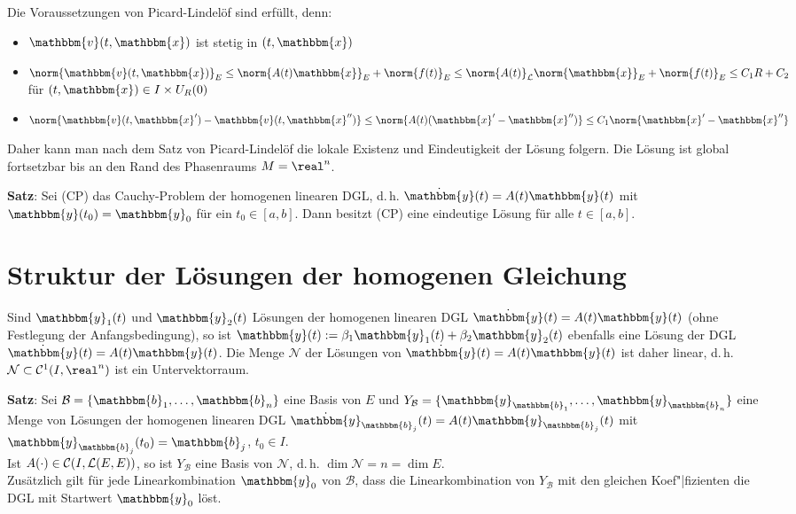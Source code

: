 Die Voraussetzungen von Picard-Lindelöf sind erfüllt, denn:
\begin{itemize}
    \item
    $\mathbbm{v}(t, \mathbbm{x})$ ist stetig in $(t, \mathbbm{x})$

    \item
    $\norm{\mathbbm{v}(t, \mathbbm{x})}_E \le
    \norm{A(t) \mathbbm{x}}_E + \norm{f(t)}_E \le
    \norm{A(t)}_\L \norm{\mathbbm{x}}_E + \norm{f(t)}_E \le
    C_1 R + C_2$ \\
    für $(t, \mathbbm{x}) \in I \times U_R(0)$

    \item
    $\norm{\mathbbm{v}(t, \mathbbm{x}') - \mathbbm{v}(t, \mathbbm{x}'')} \le
    \norm{A(t) (\mathbbm{x}' - \mathbbm{x}'')} \le
    C_1 \norm{\mathbbm{x}' - \mathbbm{x}''}$
\end{itemize}
Daher kann man nach dem Satz von Picard-Lindelöf die lokale Existenz und
Eindeutigkeit der Lösung folgern.
Die Lösung ist global fortsetzbar bis an den Rand des Phasenraums
$M = \real^n$.

\textbf{Satz}:
Sei (CP) das Cauchy-Problem der homogenen linearen DGL, d.\,h.
$\dot{\mathbbm{y}}(t) = A(t) \mathbbm{y}(t)$ mit
$\mathbbm{y}(t_0) = \mathbbm{y}_0$ für ein $t_0 \in [a, b]$.
Dann besitzt (CP) eine eindeutige Lösung für alle $t \in [a, b]$.

\pagebreak

\section{%
    Struktur der Lösungen der homogenen Gleichung%
}

Sind $\mathbbm{y}_1(t)$ und $\mathbbm{y}_2(t)$ Lösungen der homogenen
linearen DGL $\dot{\mathbbm{y}}(t) = A(t) \mathbbm{y}(t)$
(ohne Festlegung der Anfangsbedingung), so ist
$\mathbbm{y}(t) := \beta_1 \mathbbm{y}_1(t) + \beta_2 \mathbbm{y}_2(t)$
ebenfalls eine Lösung der DGL $\dot{\mathbbm{y}}(t) = A(t) \mathbbm{y}(t)$.
Die Menge $\mathcal{N}$ der Lösungen von
$\dot{\mathbbm{y}}(t) = A(t) \mathbbm{y}(t)$ ist daher linear, d.\,h.
$\mathcal{N} \subset \C^1(I, \real^n)$ ist ein Untervektorraum.

\textbf{Satz}:
Sei $\mathcal{B} = \{\mathbbm{b}_1, \dotsc, \mathbbm{b}_n\}$ eine Basis von $E$
und $Y_\mathcal{B} = \{\mathbbm{y}_{\mathbbm{b}_1}, \dotsc,
\mathbbm{y}_{\mathbbm{b}_n}\}$ eine Menge von Lösungen der
homogenen linearen DGL
$\dot{\mathbbm{y}}_{\mathbbm{b}_j}(t) = A(t) \mathbbm{y}_{\mathbbm{b}_j}(t)$
mit $\mathbbm{y}_{\mathbbm{b}_j}(t_0) = \mathbbm{b}_j$, $t_0 \in I$. \\
Ist $A(\cdot) \in \mathcal{C}(I, \mathcal{L}(E, E))$, so ist
$Y_\mathcal{B}$ eine Basis von $\mathcal{N}$, d.\,h.
$\dim \mathcal{N} = n = \dim E$. \\
Zusätzlich gilt für jede Linearkombination $\mathbbm{y}_0$
von $\mathcal{B}$, dass die
Linearkombination von $Y_\mathcal{B}$ mit den gleichen Koef"|fizienten die DGL
mit Startwert $\mathbbm{y}_0$ löst.

